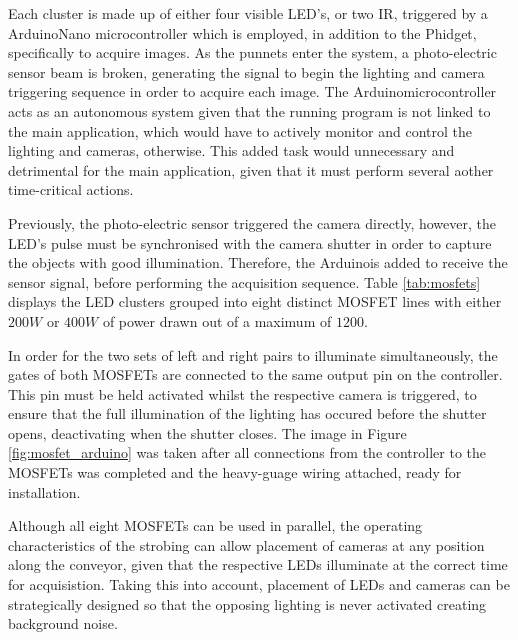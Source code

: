 \documentclass[fleqn,twoside,12pt]{report}
\begin{document}
Each cluster is made up of either four visible LED's, or two IR, triggered by a Arduino\texttrademark Nano microcontroller which is employed, in addition to the Phidget\textregistered, specifically to acquire images. As the punnets enter the system, a photo-electric sensor beam is broken, generating the signal to begin the lighting and camera triggering sequence in order to acquire each image. The Arduino\texttrademark microcontroller acts as an autonomous system given that the running program is not linked to the main application, which would have to actively monitor and control the lighting and cameras, otherwise. This added task would unnecessary and detrimental for the main application, given that it must perform several aother time-critical actions.   

Previously, the photo-electric sensor triggered the camera directly, however, the LED's pulse must be synchronised with the camera shutter in order to capture the objects with good illumination. Therefore, the Arduino\texttrademark is added to receive the sensor signal, before performing the acquisition sequence. Table \ref{tab:mosfets} displays the LED clusters grouped into eight distinct MOSFET lines with either $200W$ or $400W$ of power drawn out of a maximum of $1200$. 

In order for the two sets of left and right pairs to illuminate simultaneously, the gates of both MOSFETs are connected to the same output pin on the controller. This pin must be held activated whilst the respective camera is triggered, to ensure that the full illumination of the lighting has occured before the shutter opens, deactivating when the shutter closes. The image in Figure \ref{fig:mosfet_arduino} was taken after all connections from the controller to the MOSFETs was completed and the heavy-guage wiring attached, ready for installation. 


Although all eight MOSFETs can be used in parallel, the operating characteristics of the strobing can allow placement of cameras at any position along the conveyor, given that the respective LEDs illuminate at the correct time for acquisistion. Taking this into account, placement of LEDs and cameras can be strategically designed so that the opposing lighting is never activated creating background noise.  
\end{document}
